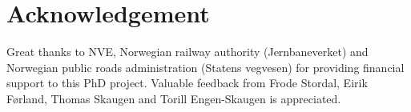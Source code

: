 \documentclass[12pt,a4paper,english]{article}
\begin{document}
\section{Acknowledgement}

Great thanks to NVE, Norwegian railway authority (Jernbaneverket) and Norwegian public roads administration (Statens vegvesen) for providing financial support to this PhD project. Valuable feedback from Frode Stordal, Eirik F{\o}rland, Thomas Skaugen and Torill Engen-Skaugen is appreciated.





\end{document}
